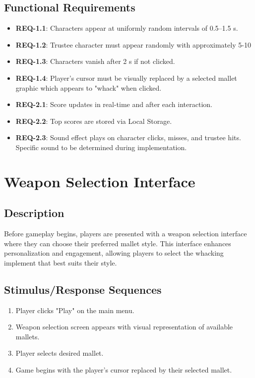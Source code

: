 \documentclass[11pt]{scrreprt}
\begin{document}
\subsection{Functional Requirements}
\begin{itemize}
  \item \textbf{REQ-1.1}: Characters appear at uniformly random intervals of 0.5–1.5 s.
  \item \textbf{REQ-1.2}: Trustee character must appear randomly with approximately 5-10%
  \item \textbf{REQ-1.3}: Characters vanish after 2 s if not clicked.
  \item \textbf{REQ-1.4}: Player's cursor must be visually replaced by a selected mallet graphic which appears to "whack" when clicked.
  \item \textbf{REQ-2.1}: Score updates in real-time and after each interaction.
  \item \textbf{REQ-2.2}: Top scores are stored via Local Storage.
  \item \textbf{REQ-2.3}: Sound effect plays on character clicks, misses, and trustee hits. Specific sound to be determined during implementation.
\end{itemize}

\section{Weapon Selection Interface}

\subsection{Description}
Before gameplay begins, players are presented with a weapon selection interface where they can choose their preferred mallet style. This interface enhances personalization and engagement, allowing players to select the whacking implement that best suits their style.

\subsection{Stimulus/Response Sequences}
\begin{enumerate}
  \item Player clicks "Play" on the main menu.
  \item Weapon selection screen appears with visual representation of available mallets.
  \item Player selects desired mallet.
  \item Game begins with the player's cursor replaced by their selected mallet.
\end{enumerate}
\end{document}
